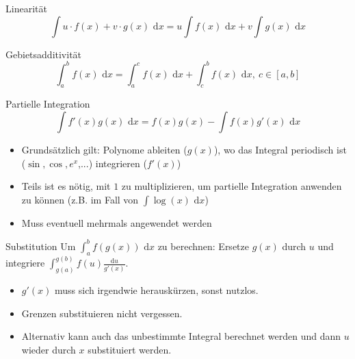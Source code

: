 \documentclass[a4paper,fontsize = 7pt]{scrartcl}
\def\dx{\text{ d}x}
\begin{document}
\begin{subbox}{Linearität}
 \vspace{-12pt}
 $$\int u\cdot f(x) + v \cdot g(x) \dx = u \int f(x) \dx + v \int g(x) \dx$$
 \vspace{-12pt}
\end{subbox}
\begin{subbox}{Gebietsadditivität}
 \vspace{-12pt}
 $$\int_a^b f(x) \dx = \int_a^c f(x) \dx + \int_c^b f(x) \dx, \ c \in [a,b]$$
 \vspace{-12pt}
\end{subbox}
\begin{mainbox}{Partielle Integration}
 \vspace{-12pt}
 $$\int f'(x) g(x) \dx = f(x)g(x) - \int f(x) g'(x) \dx$$
 \vspace{-12pt}
\end{mainbox}
\begin{itemize}
 \item Grundsätzlich gilt: Polynome ableiten ($g(x)$), wo das Integral periodisch ist ($\sin, \cos, e^x$,...) integrieren ($f'(x)$)
 \item Teils ist es nötig, mit $1$ zu multiplizieren, um partielle Integration anwenden zu können (z.B. im Fall von $\int \log(x) \dx$)
 \item Muss eventuell mehrmals angewendet werden
\end{itemize}
\begin{mainbox}{Substitution}
  \vspace{-4pt}
 Um $\int_a^b f(g(x)) \dx$ zu berechnen: Ersetze $g(x)$ durch $u$ und integriere $\int_{g(a)}^{g(b)} f(u) \frac{\text{d}u}{g'(x)}$.
 \vspace{-12pt}
\end{mainbox}
\begin{itemize}
 \item $g'(x)$ muss sich irgendwie herauskürzen, sonst nutzlos.
 \item Grenzen substituieren nicht vergessen.
 \item Alternativ kann auch das unbestimmte Integral berechnet werden und dann $u$ wieder durch $x$ substituiert werden.
\end{itemize}
\end{document}
